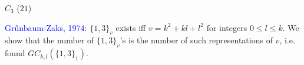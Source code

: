 \documentclass{beamer}
\begin{document}
\begin{frame}
\begin{center}
\begin{minipage}[b]{25mm}
\par
$C_{3}$  ($21$)
\end{minipage} 
\end{center}


\textcolor{blue}{Gr\H{u}nbaum-Zaks, 1974}: $\{1,3\}_v$ exists iff
$v=k^2+kl+l^2$ for integers $0\le l\le k$.
We show that the
number of
  $\{1,3\}_v$'s is the number  of such representations of $v$, i.e.
found
 $GC_{k,l}(\{1,3\}_1)$.

\end{frame}
\end{document}
